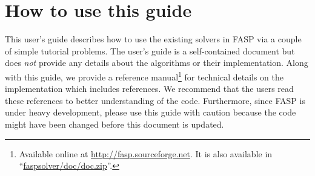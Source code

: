 \documentclass[11pt]{memoir}
\begin{document}




\section{How to use this guide}\label{sec:how}

This user's guide describes how to use the existing solvers in FASP
via a couple of simple tutorial problems. The user's guide is a
self-contained document but does \emph{not} provide any details about
the algorithms or their implementation. Along with this guide, we provide a
reference manual\footnote{Available online at
  \url{http://fasp.sourceforge.net}. It is also available in
  ``\url{faspsolver/doc/doc.zip}''.} for technical details on the
implementation which includes references. We recommend that the users
read these references to better
understanding of the code. Furthermore, since FASP is under heavy
development, please use this guide with caution because the code might
have been changed before this document is updated.
\end{document}
